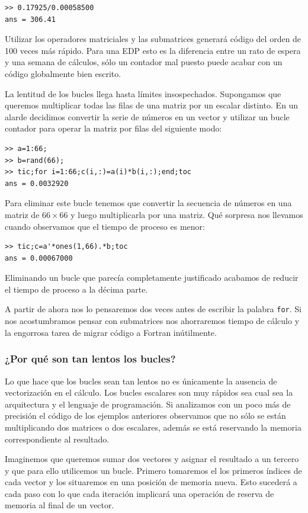 \begin{verbatim}
>> 0.17925/0.00058500
ans = 306.41
\end{verbatim}
Utilizar los operadores matriciales y las submatrices generará código
del orden de 100 veces más rápido. Para una EDP esto es la diferencia
entre un rato de espera y una semana de cálculos, sólo un contador mal
puesto puede acabar con un código globalmente bien escrito.

La lentitud de los bucles llega hasta límites insospechados.
Supongamos que queremos multiplicar todas las filas de una matriz por
un escalar distinto. En un alarde decidimos convertir la serie de
números en un vector y utilizar un bucle contador para operar la
matriz por filas del siguiente modo:

\begin{verbatim}
>> a=1:66;
>> b=rand(66);
>> tic;for i=1:66;c(i,:)=a(i)*b(i,:);end;toc
ans = 0.0032920
\end{verbatim}
Para eliminar este bucle tenemos que convertir la secuencia de números
en una matriz de $66\times66$ y luego multiplicarla por una matriz.
Qué sorpresa nos llevamos cuando observamos que el tiempo de proceso
es menor:

\begin{verbatim}
>> tic;c=a'*ones(1,66).*b;toc
ans = 0.00067000
\end{verbatim}
Eliminando un bucle que parecía completamente justificado acabamos de
reducir el tiempo de proceso a la décima parte.

A partir de ahora nos lo pensaremos dos veces antes de escribir la
palabra \texttt{for}. Si nos acostumbramos pensar con submatrices nos
ahorraremos tiempo de cálculo y la engorrosa tarea de migrar código a
Fortran inútilmente.

\subsubsection{¿Por qué son tan lentos los bucles?}

Lo que hace que los bucles sean tan lentos no es únicamente la
ausencia de vectorización en el cálculo.  Los bucles escalares son muy
rápidos sea cual sea la arquitectura y el lenguaje de programación.
Si analizamos con un poco más de precisión el código de los ejemplos
anteriores observamos que no sólo se están multiplicando dos matrices
o dos escalares, además se está reservando la memoria correspondiente
al resultado.

Imaginemos que queremos sumar dos vectores y asignar el resultado a un
tercero y que para ello utilicemos un bucle.  Primero tomaremos el los
primeros índices de cada vector y los situaremos en una posición de
memoria nueva.  Esto sucederá a cada paso con lo que cada iteración
implicará una operación de reserva de memoria al final de un vector.

